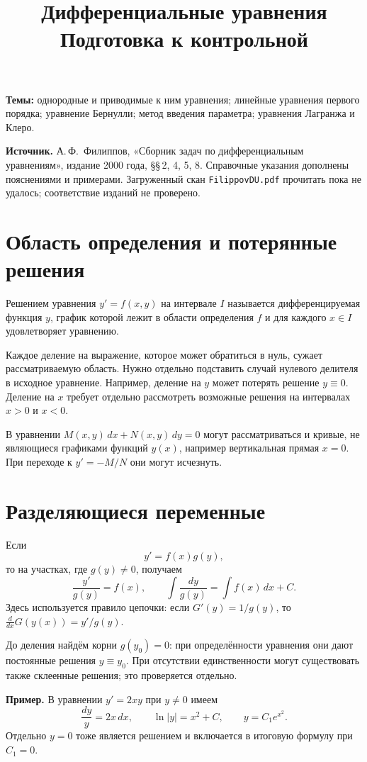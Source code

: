 \documentclass[12pt,a4paper]{article}
\title{Дифференциальные уравнения\\\large Подготовка к контрольной}
\author{}
\date{}
\begin{document}
\maketitle
\textbf{Темы:} однородные и приводимые к ним уравнения; линейные уравнения первого порядка; уравнение Бернулли; метод введения параметра; уравнения Лагранжа и Клеро.

\textbf{Источник.} А.\,Ф.~Филиппов, «Сборник задач по дифференциальным уравнениям», издание 2000 года, §§\,2, 4, 5, 8. Справочные указания дополнены пояснениями и примерами. Загруженный скан \texttt{FilippovDU.pdf} прочитать пока не удалось; соответствие изданий не проверено.

\section{Область определения и потерянные решения}
Решением уравнения $y'=f(x,y)$ на интервале $I$ называется дифференцируемая функция $y$, график которой лежит в области определения $f$ и для каждого $x\in I$ удовлетворяет уравнению.

Каждое деление на выражение, которое может обратиться в нуль, сужает рассматриваемую область. Нужно отдельно подставить случай нулевого делителя в исходное уравнение. Например, деление на $y$ может потерять решение $y\equiv0$. Деление на $x$ требует отдельно рассмотреть возможные решения на интервалах $x>0$ и $x<0$.

В уравнении $M(x,y)\,dx+N(x,y)\,dy=0$ могут рассматриваться и кривые, не являющиеся графиками функций $y(x)$, например вертикальная прямая $x=0$. При переходе к $y'=-M/N$ они могут исчезнуть.

\section{Разделяющиеся переменные}
Если
\[
y'=f(x)g(y),
\]
то на участках, где $g(y)\ne0$, получаем
\[
\frac{y'}{g(y)}=f(x),
\qquad
\int\frac{dy}{g(y)}=\int f(x)\,dx+C.
\]
Здесь используется правило цепочки: если $G'(y)=1/g(y)$, то $\frac d{dx}G(y(x))=y'/g(y)$.

До деления найдём корни $g(y_0)=0$: при определённости уравнения они дают постоянные решения $y\equiv y_0$. При отсутствии единственности могут существовать также склеенные решения; это проверяется отдельно.

\textbf{Пример.} В уравнении $y'=2xy$ при $y\ne0$ имеем
\[
\frac{dy}{y}=2x\,dx,\qquad
\ln|y|=x^2+C,\qquad y=C_1e^{x^2}.
\]
Отдельно $y=0$ тоже является решением и включается в итоговую формулу при $C_1=0$.
\end{document}
